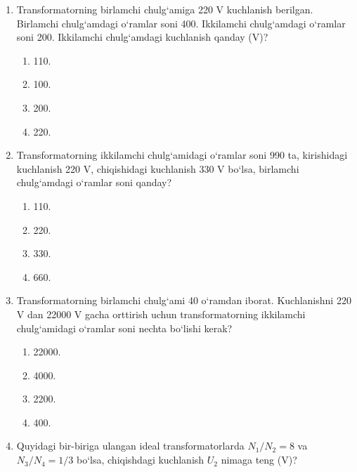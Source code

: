 \begin{enumerate}
\item Transformatorning birlamchi chulg‘amiga 220 V kuchlanish berilgan. Birlamchi chulg‘amdagi o‘ramlar soni 400. Ikkilamchi chulg‘amdagi o‘ramlar soni 200. Ikkilamchi chulg‘amdagi kuchlanish qanday (V)?
\begin{enumerate}[label=\Alph*)]
\item 110.
\item 100.
\item 200.
\item 220.
\end{enumerate}

\item Transformatorning ikkilamchi chulg‘amidagi o‘ramlar soni 990 ta, kirishidagi kuchlanish 220 V, chiqishidagi kuchlanish 330 V bo‘lsa, birlamchi chulg‘amdagi o‘ramlar soni qanday?
\begin{enumerate}[label=\Alph*)]
\item 110.
\item 220.
\item 330.
\item 660.
\end{enumerate}

\item Transformatorning birlamchi chulg‘ami 40 o‘ramdan iborat. Kuchlanishni 220 V dan 22000 V gacha orttirish uchun transformatorning ikkilamchi chulg‘amidagi o‘ramlar soni nechta bo‘lishi kerak?
\begin{enumerate}[label=\Alph*)]
\item 22000.
\item 4000.
\item 2200.
\item 400.
\end{enumerate}


\item Quyidagi bir-biriga ulangan ideal transformatorlarda $N_1/N_2 = 8$ va $N_3/N_4 = 1/3$ bo‘lsa, chiqishdagi kuchlanish $U_2$ nimaga teng (V)?

\begin{center}
\end{center}
\end{enumerate}
